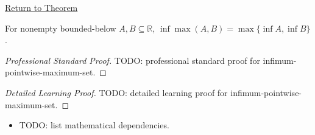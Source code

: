 \newpage
{}
\label{prf:infimum-pointwise-maximum-set}

\begin{remark*}[Return]
\hyperref[thm:infimum-pointwise-maximum-set]{Return to Theorem}
\end{remark*}

\begin{theorem*}
For nonempty bounded-below $A,B\subseteq\mathbb{R}$,
$\inf\max(A,B)=\max\{\inf A,\inf B\}$.
\end{theorem*}

\begin{proof}[Professional Standard Proof]
\LRAProofBodyStart
TODO: professional standard proof for infimum-pointwise-maximum-set.
\end{proof}

\begin{proof}[Detailed Learning Proof]
\LRAProofBodyStart
TODO: detailed learning proof for infimum-pointwise-maximum-set.
\end{proof}

\begin{remark*}
\end{remark*}

\begin{dependencies}
\begin{itemize}
  \item TODO: list mathematical dependencies.
\end{itemize}
\end{dependencies}

\clearpage
